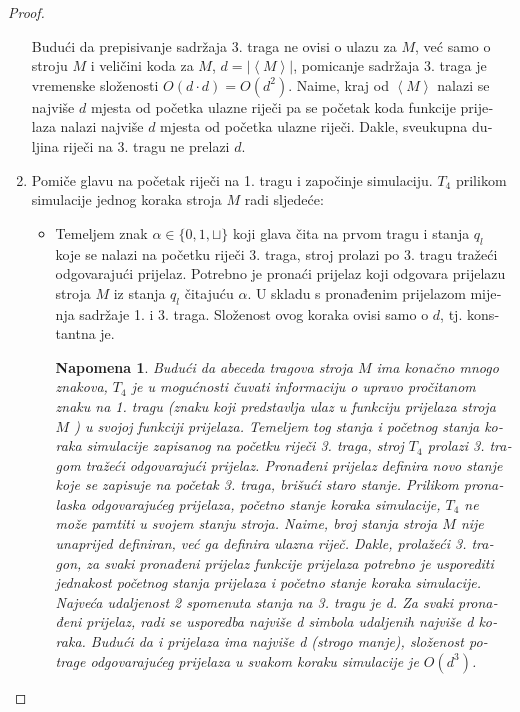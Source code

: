 \documentclass[12pt]{rectors}
\newtheorem{remark}{Napomena}[section]
\begin{document}
\begin{otherlanguage}{croatian}
\begin{proof}
\begin{enumerate}
    Budući da prepisivanje sadržaja 3. traga ne ovisi o ulazu za $M$, već samo o stroju $M$ i veličini koda za $M$, $d = |\left < M \right >|$,
    pomicanje sadržaja 3. traga je vremenske složenosti $O(d \cdot d) = O(d^2)$. Naime,
    kraj od $\left < M \right >$ nalazi se najviše $d$ mjesta od početka ulazne riječi
    pa se početak koda funkcije prijelaza nalazi najviše $d$ mjesta od početka ulazne riječi. Dakle, sveukupna duljina riječi na
    3. tragu ne prelazi $d$.
    \item Pomiče glavu na početak riječi na 1. tragu i započinje simulaciju. $T_4$ prilikom simulacije jednog koraka 
    stroja $M$ radi sljedeće:
    \begin{itemize}
        \item Temeljem znak $\alpha \in \{0,1,\sqcup\}$ koji glava čita na prvom tragu i stanja $q_l$ koje se nalazi na početku riječi 3. traga, stroj prolazi po 3. tragu tražeći odgovarajući prijelaz.
        Potrebno je pronaći prijelaz koji odgovara prijelazu stroja $M$ iz stanja $q_l$ čitajuću $\alpha$. U skladu s pronađenim prijelazom mijenja sadržaje 1. i 3. traga.
        Složenost ovog koraka ovisi samo o $d$, tj. konstantna je.
        \begin{remark}
        Budući da abeceda tragova stroja $M$ ima konačno mnogo znakova, $T_4$ je u mogućnosti čuvati 
        informaciju o upravo pročitanom znaku na 1. tragu (znaku koji predstavlja ulaz u 
        funkciju prijelaza stroja $M$ ) u svojoj funkciji prijelaza. Temeljem tog stanja i početnog stanja koraka simulacije zapisanog na početku 
        riječi 3. traga, stroj $T_4$ prolazi 3. tragom tražeći odgovarajući prijelaz. Pronađeni prijelaz definira novo stanje koje se zapisuje na početak 3. traga, brišući staro stanje. 
         Prilikom pronalaska odgovarajućeg prijelaza, početno stanje koraka simulacije, $T_4$ ne može pamtiti u svojem stanju stroja. Naime, broj stanja stroja $M$ nije unaprijed definiran, već ga definira ulazna riječ.
          Dakle, prolažeći 3. tragon, za svaki pronađeni prijelaz funkcije prijelaza potrebno je usporediti jednakost 
        početnog stanja prijelaza i početno stanje koraka simulacije. 
        Najveća udaljenost 2 spomenuta stanja na 3. tragu je d. Za svaki pronađeni
         prijelaz, radi se usporedba najviše d simbola udaljenih najviše d koraka. Budući da i prijelaza ima 
        najviše d (strogo manje), složenost potrage odgovarajućeg prijelaza u svakom koraku simulacije je $O(d^3)$.
    

\end{remark}
\end{itemize}
\end{enumerate}
\end{proof}
\end{otherlanguage}
\end{document}
